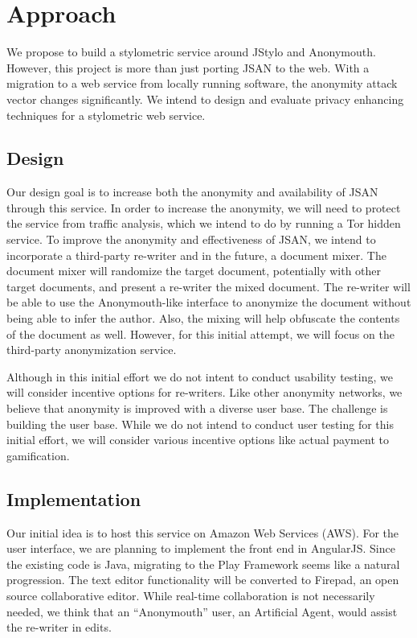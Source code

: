 \documentclass[letterpaper]{article}
\begin{document}
\section*{Approach}\label{sec:approach}

We propose to build a stylometric service around JStylo and
Anonymouth.  However, this project is more than just porting JSAN to
the web.  With a migration to a web service from locally running
software, the anonymity attack vector changes significantly.  We
intend to design and evaluate privacy enhancing techniques for
a stylometric web service.

\subsection{Design}

Our design goal is to increase both the anonymity and availability of
JSAN through this service.  In order to increase the anonymity, we
will need to protect the service from traffic analysis, which we
intend to do by running a Tor hidden service.  To improve the
anonymity and effectiveness of JSAN, we intend to incorporate a
third-party re-writer and in the future, a document mixer.  The
document mixer will randomize the target document, potentially with
other target documents, and present a re-writer the mixed document.
The re-writer will be able to use the Anonymouth-like interface to
anonymize the document without being able to infer the author.  Also,
the mixing will help obfuscate the contents of the document as well.
However, for this initial attempt, we will focus on the third-party
anonymization service.

Although in this initial effort we do not intent to conduct usability
testing, we will consider incentive options for re-writers.  Like
other anonymity networks, we believe that anonymity is improved with a
diverse user base.  The challenge is building the user base.  While we
do not intend to conduct user testing for this initial effort, we will
consider various incentive options like actual payment to
gamification.

\subsection{Implementation}

Our initial idea is to host this service on Amazon Web Services
(AWS).  For the user interface, we are planning to implement the front
end in AngularJS.  Since the existing code is Java, migrating to the
Play Framework seems like a natural progression.  The text editor
functionality will be converted to Firepad, an open source
collaborative editor.  While real-time collaboration is not
necessarily needed, we think that an ``Anonymouth'' user, an
Artificial Agent, would assist the re-writer in edits.
\end{document}
